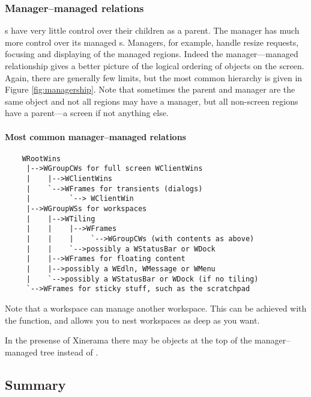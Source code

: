 \subsubsection{Manager--managed relations}

s have very little control over their children as a parent.
The manager  has much more control over its
managed s. Managers, for example, handle resize requests,
focusing and displaying of the managed regions. Indeed the manager---managed
relationship gives a better picture of the logical ordering of objects on
the screen. Again, there are generally few limits, but the most common
hierarchy is given in Figure \ref{fig:managership}. Note that sometimes
the parent and manager are the same object and not all regions may have
a manager, but all non-screen regions have a parent---a screen if not 
anything else.

\paragraph{Most common manager--managed relations}
\label{par:managership}
\begin{verbatim}
    WRootWins
     |-->WGroupCWs for full screen WClientWins
     |    |-->WClientWins
     |    `-->WFrames for transients (dialogs)
     |         `--> WClientWin
     |-->WGroupWSs for workspaces
     |    |-->WTiling
     |    |    |-->WFrames
     |    |    |    `-->WGroupCWs (with contents as above)
     |    |    `-->possibly a WStatusBar or WDock
     |    |-->WFrames for floating content
     |    |-->possibly a WEdln, WMessage or WMenu
     |    `-->possibly a WStatusBar or WDock (if no tiling)
     `-->WFrames for sticky stuff, such as the scratchpad
\end{verbatim}

Note that a workspace can manage another workspace. This can be
achieved with the  function, and allows you to nest
workspaces as deep as you want.


In the presense of Xinerama there may be  
objects at the top of the manager--managed tree instead of .

\subsection{Summary}

